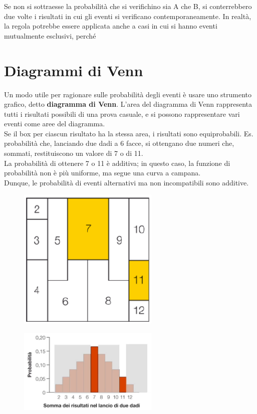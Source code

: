 \documentclass[10pt, draft]{book}
\begin{document}
Se non si sottraesse la probabilità che si verifichino sia A che B, si conterrebbero due volte i risultati in cui gli eventi si verificano contemporaneamente.
In realtà, la regola potrebbe essere applicata anche a casi in cui si hanno eventi mutualmente esclusivi, \colorbox{lyellow}{perché}

\section{Diagrammi di Venn}
Un modo utile per ragionare sulle probabilità degli eventi è usare uno strumento grafico, detto \textbf{diagramma di Venn}. L'area del diagramma di Venn rappresenta tutti i risultati possibili di una prova casuale, e si possono rappresentare vari eventi come aree del diagramma. 
\\
Se il box per ciascun risultato ha la stessa area, i risultati sono equiprobabili.
Es. probabilità che, lanciando due dadi a 6 facce, si ottengano due numeri che, sommati, restituiscono un valore di 7 o di 11.
\\
La probabilità di ottenere 7 o 11 è additiva; in questo caso, la funzione di probabilità non è più uniforme, ma segue una curva a campana.
\\
Dunque, le probabilità di eventi alternativi ma non incompatibili sono additive.
\begin{figure}[h]\label{fig5.5-1}
    \centering
    \includegraphics[width=0.6\textwidth]{fig5.5-1}
    \caption{\small{}}
\end{figure}
\begin{figure}[h]\label{istogrammaperdiagramma}
    \centering
    \includegraphics[width=0.6\textwidth]{istogrammaperdiagramma}
    \caption{\small{}}
\end{figure}
\end{document}
